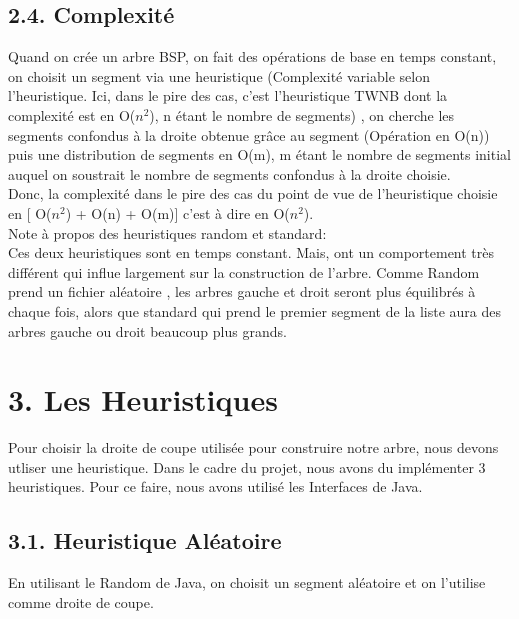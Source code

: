 \documentclass[a4paper,12pt]{report}	%
\begin{document}
    {\subsection*{2.4. Complexité}}
    Quand on crée un arbre BSP, on fait des opérations de base en temps constant, on choisit un segment via une heuristique (Complexité variable selon l'heuristique. Ici, dans le pire des cas, c'est l'heuristique TWNB dont la complexité est en O($n^2$), n étant le nombre de segments) , on cherche les segments confondus à la droite obtenue grâce au segment (Opération en O(n)) puis une distribution de segments en O(m), m étant le nombre de segments initial auquel on soustrait le nombre de segments confondus à la droite choisie.\\    
\indent Donc, la complexité dans le pire des cas du point de vue de l'heuristique choisie en [ O($n^2$) + O(n) + O(m)] c'est à dire en O($n^2$).\\
\indent Note à propos des heuristiques random et standard:\\
\indent Ces deux heuristiques sont en temps constant. Mais, ont un comportement très différent qui influe largement sur la construction de l'arbre. Comme Random prend un fichier aléatoire , les arbres gauche et droit seront plus équilibrés à chaque fois, alors que standard qui prend le premier segment de la liste aura des arbres gauche ou droit beaucoup plus grands.\\
    
    \newpage
    
    {\section*{3. Les Heuristiques}}
      Pour choisir la droite de coupe utilisée pour construire notre arbre, nous devons utliser une heuristique. Dans le cadre du projet, nous avons du implémenter 3 heuristiques. Pour ce faire, nous avons utilisé les Interfaces de Java.\\
    
    {\subsection*{3.1. Heuristique Aléatoire}}
    En utilisant le Random de Java, on choisit un segment aléatoire et on l'utilise comme droite de coupe. \\
    
\end{document}
